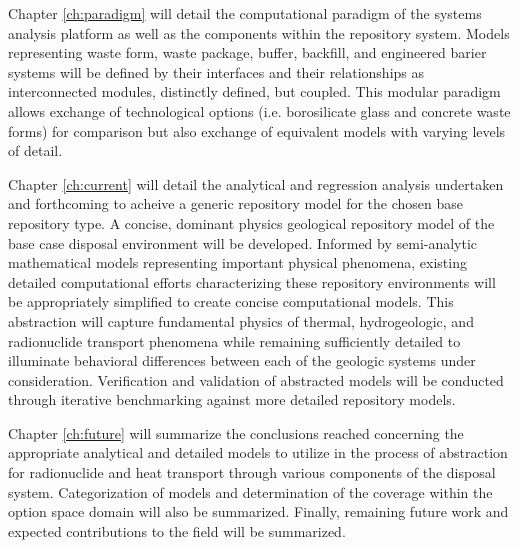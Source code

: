 
Chapter \ref{ch:paradigm} will detail the computational paradigm of the \Cyclus 
systems analysis platform as well as the components within the repository 
system. Models
representing waste form, waste package, buffer, backfill, and engineered barier 
systems will be defined by their interfaces and their relationships as 
interconnected modules, distinctly defined, but coupled. This modular paradigm 
allows exchange  of technological options (i.e. borosilicate glass and concrete 
waste forms) for comparison but also exchange of equivalent models with varying 
levels of detail.


Chapter \ref{ch:current} will detail the analytical and regression analysis 
undertaken and forthcoming to acheive a generic repository model for the chosen 
base repository type. A concise, dominant physics geological repository model of 
the base case disposal environment will be developed. Informed by semi-analytic 
mathematical models representing important physical phenomena, existing detailed 
computational efforts characterizing these repository environments will be 
appropriately simplified to create concise computational models. This 
abstraction will capture fundamental physics of thermal, hydrogeologic, and 
radionuclide transport phenomena while remaining sufficiently detailed to 
illuminate behavioral differences between each of the geologic systems under 
consideration.  Verification and validation of abstracted models will be 
conducted through iterative benchmarking against more detailed repository 
models.


Chapter \ref{ch:future} will summarize the conclusions reached concerning the 
appropriate analytical and detailed models to utilize in the process of 
abstraction for radionuclide and heat transport through various components of 
the disposal system. Categorization of models and determination of the coverage 
within the option space domain will also be summarized. Finally, remaining 
future work and expected contributions to the field will be summarized. 


